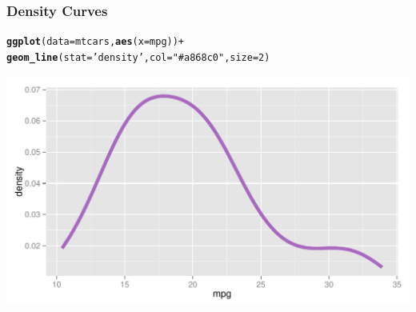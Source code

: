 \documentclass[12pt]{beamer}\usepackage[]{graphicx}\usepackage[]{color}
\makeatletter
\newcommand{\hlnum}[1]{\textcolor[rgb]{0.686,0.059,0.569}{#1}}%
\newcommand{\hlstr}[1]{\textcolor[rgb]{0.192,0.494,0.8}{#1}}%
\newcommand{\hlopt}[1]{\textcolor[rgb]{0,0,0}{#1}}%
\newcommand{\hlstd}[1]{\textcolor[rgb]{0.345,0.345,0.345}{#1}}%
\newcommand{\hlkwc}[1]{\textcolor[rgb]{0.333,0.667,0.333}{#1}}%
\newcommand{\hlkwd}[1]{\textcolor[rgb]{0.737,0.353,0.396}{\textbf{#1}}}%
\newenvironment{kframe}{%
 \def\at@end@of@kframe{}%
 \ifinner\ifhmode%
  \def\at@end@of@kframe{\end{minipage}}%
  \begin{minipage}{\columnwidth}%
 \fi\fi%
 \def\FrameCommand##1{\hskip\@totalleftmargin \hskip-\fboxsep
 \colorbox{shadecolor}{##1}\hskip-\fboxsep
     \hskip-\linewidth \hskip-\@totalleftmargin \hskip\columnwidth}%
 \MakeFramed {\advance\hsize-\width
   \@totalleftmargin\z@ \linewidth\hsize
   \@setminipage}}%
 {\par\unskip\endMakeFramed%
 \at@end@of@kframe}
\newenvironment{knitrout}{}{} %
\makeatother
\begin{document}
\begin{frame}[fragile]
\frametitle{Density Curves}

\begin{knitrout}\scriptsize
{}\color{fgcolor}\begin{kframe}
\begin{alltt}
\hlkwd{ggplot}\hlstd{(}\hlkwc{data} \hlstd{= mtcars,} \hlkwd{aes}\hlstd{(}\hlkwc{x} \hlstd{= mpg))} \hlopt{+}
  \hlkwd{geom_line}\hlstd{(}\hlkwc{stat} \hlstd{=} \hlstr{'density'}\hlstd{,} \hlkwc{col} \hlstd{=} \hlstr{"#a868c0"}\hlstd{,} \hlkwc{size} \hlstd{=} \hlnum{2}\hlstd{)}
\end{alltt}
\end{kframe}

{\centering \includegraphics[width=.9\linewidth,height=.5\linewidth]{figure/unnamed-chunk-11-1} 

}



\end{knitrout}

\end{frame}

\end{document}
